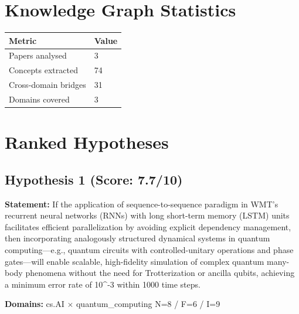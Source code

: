\documentclass[12pt,a4paper]{article}
\begin{document}
\section{Knowledge Graph Statistics}

\begin{tabular}{ll}
\toprule
Metric & Value \\
\midrule
Papers analysed   & 3 \\
Concepts extracted & 74 \\
Cross-domain bridges & 31 \\
Domains covered   & 3 \\
\bottomrule
\end{tabular}

\section{Ranked Hypotheses}

\subsection*{Hypothesis 1 (Score: 7.7/10)}

\textbf{Statement:} If the application of sequence-to-sequence paradigm in WMT's recurrent neural networks (RNNs) with long short-term memory (LSTM) units facilitates efficient parallelization by avoiding explicit dependency management, then incorporating analogously structured dynamical systems in quantum computing—e.g., quantum circuits with controlled-unitary operations and phase gates—will enable scalable, high-fidelity simulation of complex quantum many-body phenomena without the need for Trotterization or ancilla qubits, achieving a minimum error rate of 10\textasciicircum{}-3 within 1000 time steps.

\noindent\textbf{Domains:} cs.AI $\times$ quantum\_computing
\hspace{1em} N=8 / F=6 / I=9
\end{document}
